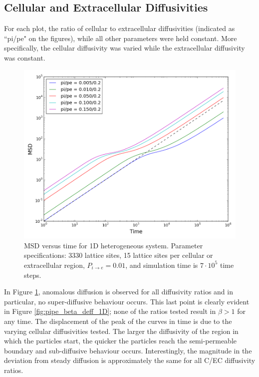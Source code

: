 \clearpage
\subsection{Cellular and Extracellular Diffusivities}
\label{sec:1D-cellular-extracellular-diffusivities}
	For each plot, the ratio of cellular to extracellular diffusivities (indicated as ``pi/pe" on the figures), while all other parameters were held constant. More specifically, the cellular diffusivity was varied while the extracellular diffusivity was constant.
	
	\begin{figure}[h!]
		\centering
		\includegraphics[width=1.0\linewidth]{../images/1D/pipe_msd_1D}
		\caption{MSD versus time for 1D heterogeneous system. Parameter specifications: 3330 lattice sites, 15 lattice sites per cellular or extracellular region, $ P_{i \rightarrow e} = 0.01 $, and simulation time is $ 7\cdot 10^5 $ time steps.}
		\label{fig:pipe_msd_1D}
	\end{figure}
	
	In Figure \ref{fig:pipe_msd_1D}, anomalous diffusion is observed for all diffusivity ratios and in particular, no super-diffusive behaviour occurs. This last point is clearly evident in Figure \ref{fig:pipe_beta_deff_1D}; none of the ratios tested result in $ \beta > 1 $ for any time. The displacement of the peak of the curves in time is due to the varying cellular diffusivities tested. The larger the diffusivity of the region in which the particles start, the quicker the particles reach the semi-permeable boundary and sub-diffusive behaviour occurs. Interestingly, the magnitude in the deviation from steady diffusion is approximately the same for all C/EC diffusivity ratios. 
	
